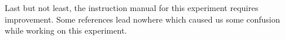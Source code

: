 \documentclass[
    twoside=false,
    twocolumn=true,
    fontsize=11pt,
]{scrarticle}
\begin{document}
Last but not least, the instruction manual \autocite{instruction} for this experiment requires improvement. Some references lead nowhere which caused us some confusion while working on this experiment.



\nocite{*}
\printbibliography
\end{document}
